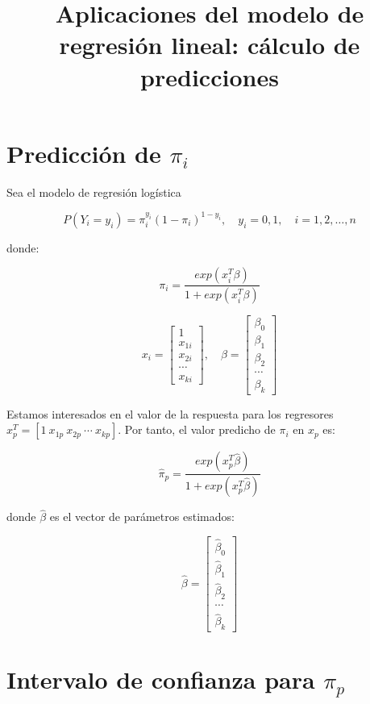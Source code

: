 \documentclass[
]{article}
\title{Aplicaciones del modelo de regresión lineal: cálculo de
predicciones}
\author{}
\date{\vspace{-2.5em}}
\begin{document}
\maketitle

{
\setcounter{tocdepth}{2}
\tableofcontents
}
\hypertarget{predicciuxf3n-de-pi_i}{%
\section{\texorpdfstring{Predicción de
\(\pi_i\)}{Predicción de \textbackslash pi\_i}}\label{predicciuxf3n-de-pi_i}}

Sea el modelo de regresión logística

\[
P(Y_i = y_i) = \pi_i^{y_i} (1 - \pi_i)^{1-y_i}, \quad y_i = 0,1, \quad i = 1,2,\ldots,n
\]

donde:

\[
\pi_i = \frac{exp(x_i^T \beta)}{1 + exp(x_i^T \beta)}
\]

\[
x_i = 
\begin{bmatrix}
1 \\ x_{1i} \\ x_{2i} \\ \cdots \\ x_{ki}
\end{bmatrix}
, \quad
\beta = 
\begin{bmatrix}
\beta_0 \\ \beta_1 \\ \beta_2 \\ \cdots \\ \beta_k
\end{bmatrix}
\]

Estamos interesados en el valor de la respuesta para los regresores
\(x_p^T = [1 \ x_{1p} \ x_{2p} \ \cdots \ x_{kp}]\). Por tanto, el valor
predicho de \(\pi_i\) en \(x_p\) es:

\[
\hat \pi_p = \frac{exp(x_p^T \hat \beta)}{1 + exp(x_p^T \hat \beta)}
\]

donde \(\hat \beta\) es el vector de parámetros estimados:

\[
\hat \beta = 
\begin{bmatrix}
\hat \beta_0 \\ \hat \beta_1 \\ \hat \beta_2 \\ \cdots \\ \hat \beta_k
\end{bmatrix}
\]

\hypertarget{intervalo-de-confianza-para-pi_p}{%
\section{\texorpdfstring{Intervalo de confianza para
\(\pi_p\)}{Intervalo de confianza para \textbackslash pi\_p}}\label{intervalo-de-confianza-para-pi_p}}
\end{document}
